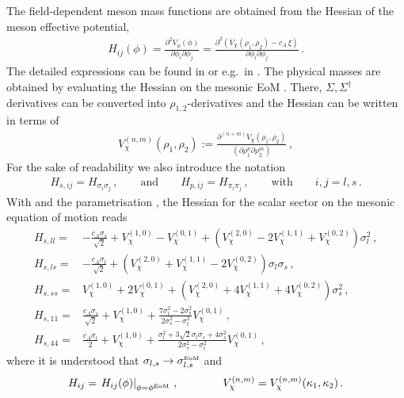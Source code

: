 \documentclass[reprint,twocolumn,superscriptaddress,preprintnumbers,amsmath,amssymb,aps,prd,floatfix]{revtex4-2}
\begin{document}
The field-dependent meson mass functions are obtained from the Hessian of the meson effective potential, 
%
\begin{align}
	H_{ij}(\phi)=\frac{ \partial^2 {V}_{\phi} (\phi)}{\partial \phi_i \partial \phi_j} =\frac{ \partial^2\left(  {V}_{\chi}(\rho_1,\rho_2)-c_A\, \xi\right)}{\partial \phi_i \partial \phi_j}   \,.
\label{mesonmass_eq}
\end{align}
%
The detailed expressions can be found in  or e.g.~in \cite{Rennecke:2016tkm, Wen:2018nkn}. The physical masses are obtained by evaluating the Hessian on the mesonic EoM . There, $\Sigma, \Sigma^\dagger$ derivatives can be converted into $\rho_{1,2}$-derivatives and the Hessian  can be written in terms of 
%
\begin{align} 
	V_\chi^{(n,m)}(\rho_1,\rho_2) := \frac{\partial^{(n+m)} V_\chi  (\rho_1,\rho_2)}{(\partial \rho_1^n \partial \rho_2 ^m)}\,, 
\end{align} 
%	  
For the sake of readability we also introduce the notation 
%
\begin{align} 
H_{s,ij} =H_{\sigma_{i}\sigma_{j}}\,,\qquad  \textrm{and}\qquad 	H_{p,ij} =H_{\pi_{i}\pi_{j}}\,, \qquad \textrm{with}\qquad i,j=l,s\,.
\label{eq:Hsp}
\end{align} 
%
With  and the parametrisation , the Hessian for the scalar sector on the mesonic equation of motion reads 
%
\begin{align}\nonumber 
	H_{s,ll}=&-\frac{c_A \sigma_s}{\sqrt{2}}+V_\chi^{(1,0)}-V_\chi^{(0,1)} + (V_\chi^{(2,0)} -2V_\chi^{(1,1)}+V_\chi^{(0,2)})\sigma_l^2\,, \\[1ex]\nonumber 
	H_{s,ls}=&-\frac{c_A \sigma_l}{\sqrt{2}}+ (V_\chi^{(2,0)}+V_\chi^{(1,1)}-2V_\chi^{(0,2)}) \sigma_l \sigma_s\,, \\[1ex]\nonumber 
	H_{s,ss}=&V_\chi^{(1,0)}+2 V_\chi^{(0,1)} +(V_\chi^{(2,0)}+4V_\chi^{(1,1)}+4V_\chi^{(0,2)})\sigma_s^2\,,  \\[1ex]\nonumber 
	H_{s,11}=&\frac{c_A \sigma_s}{\sqrt{2}}+V_\chi^{(1,0)} +\frac{7 \sigma_l^2 - 2 \sigma_s^2}{2 \sigma_s^2-\sigma_l^2}V_\chi^{(0,1)}\,, \\
	H_{s,44}=&\frac{c_A \sigma_l}{2}+V_\chi^{(1,0)}+\frac{\sigma_l^2+3 \sqrt{2} \sigma_l\sigma_s+4 \sigma_s^2}{2 \sigma_s^2-\sigma_l^2}V_\chi^{(0,1)}\,, 
\end{align}
%
where it is understood that $\sigma_{l,s}\to \sigma_{l,s}^\textrm{\tiny{EoM}}$ and 
%
\begin{align} 
	H_{ij}= \left. H_{ij}(\phi)\right|_{\phi=\phi^\textrm{\tiny{EoM}}}\,,\qquad \qquad V_\chi^{(n,m)}=V_\chi^{(n,m)}(\kappa_1,\kappa_2)\,.
\end{align} 
\end{document}
